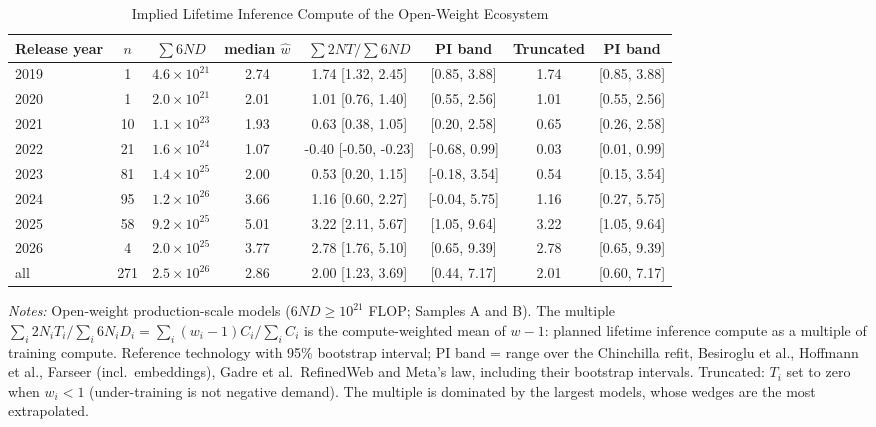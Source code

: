 \begin{table}[htbp]
\centering
\scriptsize
\begin{threeparttable}
\caption{Implied Lifetime Inference Compute of the Open-Weight Ecosystem}
\label{tab:m3_aggregate}
\begin{tabular}{@{}lccccccc@{}}
\toprule
Release year & $n$ & $\sum 6ND$ & median $\hat w$ & $\sum 2NT/\sum 6ND$ & PI band & Truncated & PI band \\
\midrule
2019 & 1 & $4.6\times10^{21}$ & 2.74 & 1.74 [1.32, 2.45] & [0.85, 3.88] & 1.74 & [0.85, 3.88] \\
2020 & 1 & $2.0\times10^{21}$ & 2.01 & 1.01 [0.76, 1.40] & [0.55, 2.56] & 1.01 & [0.55, 2.56] \\
2021 & 10 & $1.1\times10^{23}$ & 1.93 & 0.63 [0.38, 1.05] & [0.20, 2.58] & 0.65 & [0.26, 2.58] \\
2022 & 21 & $1.6\times10^{24}$ & 1.07 & -0.40 [-0.50, -0.23] & [-0.68, 0.99] & 0.03 & [0.01, 0.99] \\
2023 & 81 & $1.4\times10^{25}$ & 2.00 & 0.53 [0.20, 1.15] & [-0.18, 3.54] & 0.54 & [0.15, 3.54] \\
2024 & 95 & $1.2\times10^{26}$ & 3.66 & 1.16 [0.60, 2.27] & [-0.04, 5.75] & 1.16 & [0.27, 5.75] \\
2025 & 58 & $9.2\times10^{25}$ & 5.01 & 3.22 [2.11, 5.67] & [1.05, 9.64] & 3.22 & [1.05, 9.64] \\
2026 & 4 & $2.0\times10^{25}$ & 3.77 & 2.78 [1.76, 5.10] & [0.65, 9.39] & 2.78 & [0.65, 9.39] \\
all & 271 & $2.5\times10^{26}$ & 2.86 & 2.00 [1.23, 3.69] & [0.44, 7.17] & 2.01 & [0.60, 7.17] \\
\bottomrule
\end{tabular}
\begin{tablenotes}\footnotesize
\item \textit{Notes:} Open-weight production-scale models ($6ND\ge10^{21}$ FLOP; Samples A and B). The multiple $\sum_i 2N_iT_i/\sum_i 6N_iD_i=\sum_i(w_i-1)C_i/\sum_iC_i$ is the compute-weighted mean of $w-1$: planned lifetime inference compute as a multiple of training compute. Reference technology with 95\% bootstrap interval; PI band = range over the Chinchilla refit, Besiroglu et al., Hoffmann et al., Farseer (incl.\ embeddings), Gadre et al.\ RefinedWeb and Meta's law, including their bootstrap intervals. Truncated: $T_i$ set to zero when $w_i<1$ (under-training is not negative demand). The multiple is dominated by the largest models, whose wedges are the most extrapolated.
\end{tablenotes}
\end{threeparttable}
\end{table}
